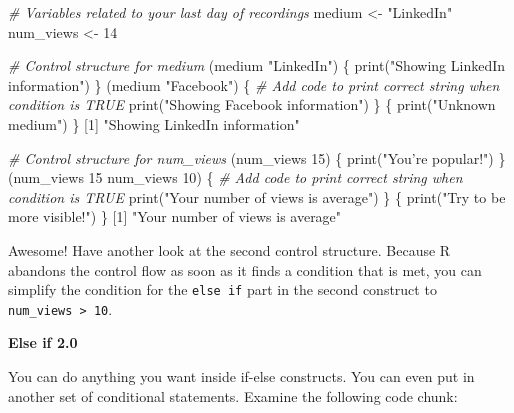 \documentclass[]{article}
\newcommand{\hlnum}[1]{\textcolor[rgb]{0.816,0.125,0.439}{#1}}%
\newcommand{\hlstr}[1]{\textcolor[rgb]{0.251,0.627,0.251}{#1}}%
\newcommand{\hlcom}[1]{\textcolor[rgb]{0.502,0.502,0.502}{\textit{#1}}}%
\newcommand{\hlstd}[1]{\textcolor[rgb]{0.251,0.251,0.251}{#1}}%
\newcommand{\hlkwd}[1]{\textcolor[rgb]{0.878,0.439,0.125}{#1}}%
\newenvironment{Shaded}{\begin{myshaded}}{\end{myshaded}}
\newcommand{\KeywordTok}[1]{\hlkwd{#1}}
\newcommand{\DecValTok}[1]{\hlnum{#1}}
\newcommand{\StringTok}[1]{\hlstr{#1}}
\newcommand{\CommentTok}[1]{\hlcom{#1}}
\newcommand{\NormalTok}[1]{\hlstd{#1}}
\begin{document}
\begin{Shaded}
\begin{Highlighting}[]
\CommentTok{# Variables related to your last day of recordings}
\NormalTok{medium <-}\StringTok{ "LinkedIn"}
\NormalTok{num_views <-}\StringTok{ }\DecValTok{14}

\CommentTok{# Control structure for medium}
\NormalTok{ (medium }\OperatorTok{==}\StringTok{ "LinkedIn"}\NormalTok{) \{}
\KeywordTok{print}\NormalTok{(}\StringTok{"Showing LinkedIn information"}\NormalTok{)}
\NormalTok{\} } \NormalTok{ (medium }\OperatorTok{==}\StringTok{ "Facebook"}\NormalTok{) \{}
\CommentTok{# Add code to print correct string when condition is TRUE}
\KeywordTok{print}\NormalTok{(}\StringTok{"Showing Facebook information"}\NormalTok{)}
\NormalTok{\} }\NormalTok{ \{}
\KeywordTok{print}\NormalTok{(}\StringTok{"Unknown medium"}\NormalTok{)}
\NormalTok{\}}
\NormalTok{   [}\DecValTok{1}\NormalTok{] }\StringTok{"Showing LinkedIn information"}

\CommentTok{# Control structure for num_views}
\NormalTok{ (num_views }\OperatorTok{>}\StringTok{ }\DecValTok{15}\NormalTok{) \{}
\KeywordTok{print}\NormalTok{(}\StringTok{"You're popular!"}\NormalTok{)}
\NormalTok{\} } \NormalTok{ (num_views }\OperatorTok{<=}\StringTok{ }\DecValTok{15} \OperatorTok{&}\StringTok{ }\NormalTok{num_views }\OperatorTok{>}\StringTok{ }\DecValTok{10}\NormalTok{) \{}
\CommentTok{# Add code to print correct string when condition is TRUE}
\KeywordTok{print}\NormalTok{(}\StringTok{"Your number of views is average"}\NormalTok{)}
\NormalTok{\} }\NormalTok{ \{}
\KeywordTok{print}\NormalTok{(}\StringTok{"Try to be more visible!"}\NormalTok{)}
\NormalTok{\}}
\NormalTok{   [}\DecValTok{1}\NormalTok{] }\StringTok{"Your number of views is average"}
\end{Highlighting}
\end{Shaded}

Awesome! Have another look at the second control structure. Because R
abandons the control flow as soon as it finds a condition that is met,
you can simplify the condition for the \texttt{else\ if} part in the
second construct to \texttt{num\_views\ \textgreater{}\ 10}.

\textbf{Else if 2.0}

You can do anything you want inside if-else constructs. You can even put
in another set of conditional statements. Examine the following code
chunk:
\end{document}
